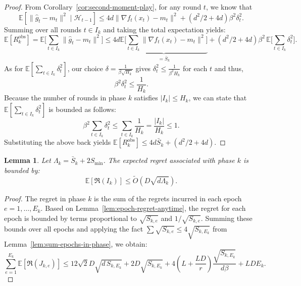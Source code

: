 \documentclass[journal,onecolumn]{IEEEtran}
\theoremstyle{plain}
\newtheorem{lemma}[theorem]{Lemma}
\theoremstyle{definition}
\theoremstyle{remark}
\newcommand{\regret}{\mathfrak{R}}
\begin{document}
{\begin{proof}
    From Corollary~\ref{cor:second-moment-play}, for any round $t$, we know that
    \begin{equation*}
        \mathbb{E}[\|\hat g_{t}-m_{t}\|^{2} \mid \mathcal{H}_{t-1}] \le 4d\|\nabla
        f_{t}(x_{t})-m_{t}\|^{2} + (d^{2}/2+4d)\beta^{2}\delta_{t}^{2}.
    \end{equation*}
    Summing over all rounds $t \in I_{k}$ and taking the total expectation
    yields:
    \begin{equation*}
        \mathbb{E}[R^{\mathrm{obs}}_{k}] = \mathbb{E}\bigg[\sum_{t\in I_k}\|\hat
        g_{t}-m_{t}\|^{2}\bigg] \le 4d\underbrace{\mathbb{E}\bigg[\sum_{t\in I_k}\|\nabla
        f_t(x_t)-m_t\|^2\bigg]}_{=\bar S_k}+(d^{2}/2+4d)\beta^{2}\,\mathbb{E}\bigg
        [\sum_{t\in I_k}\delta_{t}^{2}\bigg].
    \end{equation*}
    As for $\mathbb{E}\left[\sum_{t\in I_{k}}\delta^{2}_{t}\right]$, our choice $\delta = \frac{1}{\beta\sqrt{H_{k}}}$ gives $\delta^{2}_{t}\leq\frac{1}{\beta^{2}H_{k}}$ for each $t$ and thus,
    \begin{equation*}
        \beta^{2} \delta_{t}^{2} \le \frac{1}{H_{k}}.
    \end{equation*}
    Because the number of rounds in phase $k$ satisfies $|I_k|\le H_k$, we can state that $\mathbb{E}[\sum_{t\in I_{k}}\delta^{2}_{t}]$ is bounded as follows:
    \begin{equation*}
        \beta^{2} \sum_{t\in I_k}\delta_{t}^{2} \le\sum_{t\in I_k}\frac{1}{H_{k}}
        =\frac{|I_{k}|}{H_{k}}\le 1.
    \end{equation*}
    Substituting the above back yields
    $\mathbb{E}[R^{\mathrm{obs}}_{k}] \le 4d \bar S_{k} + (d^{2}/2+4d)$.
\end{proof}
\fi

\begin{lemma}
    \label{lem:phase-regret} Let $\Lambda_{k}= \bar S_{k}+ 2S_{\min}$. The expected regret associated with phase $k$ is bounded by:
    \begin{equation*}
        \mathbb{E}[\regret(I_{k})] \le \widetilde O\left(D\sqrt{d\Lambda_k}
    \right).
    \end{equation*}
\end{lemma}

\begin{proof}
    The regret in phase $k$ is the sum of the regrets incurred in each epoch $e=1,
    \dots,E_{k}$. Based on Lemma~\ref{lem:epoch-regret-anytime}, the regret for each
    epoch is bounded by terms proportional to $\sqrt{S_{k,e}}$ and $1/\sqrt{S_{k,e}}$.
    Summing these bounds over all epochs and applying the fact
    $\sum \sqrt{S_{k,e}}\le 4\sqrt{S_{k,E_k}}$
    from Lemma~\ref{lem:sum-epochs-in-phase}, we obtain:
    \begin{equation*}
        \sum_{e=1}^{E_k}\mathbb{E}[\regret(J_{k,e})] \le 12\sqrt{2}D\sqrt{d\,S_{k,E_k}}
        + 2 D\sqrt{S_{k,E_k}}+4\left(L+\frac{LD}{r}\right)\frac{\sqrt{S_{k,E_k}}}{d\beta}+LDE_k.
    \end{equation*}


\end{proof}}
\end{document}
